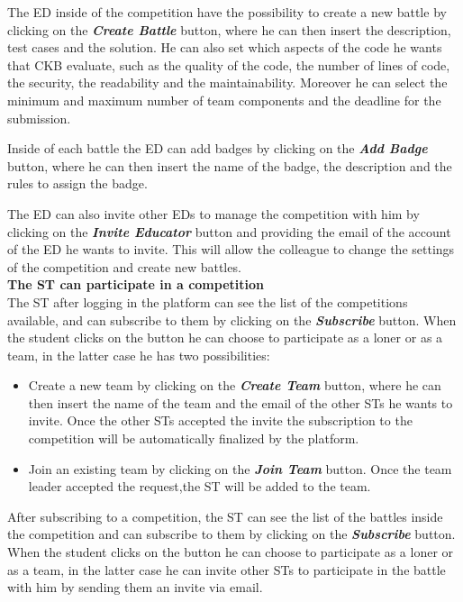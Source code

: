 The ED inside of the competition have the possibility to create a new battle by clicking on the \textbf{\textit{Create Battle}} button, where he can then insert the description, test cases and the solution. He can also set which aspects of the code he wants that CKB evaluate, such as the quality of the code, the number of lines of code, the security, the readability and the maintainability. Moreover he can select the minimum and maximum number of team components and the deadline for the submission.

Inside of each battle the ED can add badges by clicking on the \textbf{\textit{Add Badge}} button, where he can then insert the name of the badge, the description and the rules to assign the badge.

The ED can also invite other EDs to manage the competition with him by clicking on the \textbf{\textit{Invite Educator}} button and providing the email of the account of the ED he wants to invite. This will allow the colleague to change the settings of the competition and create new battles. \\

\textbf{The ST can participate in a competition} \\
The ST after logging in the platform can see the list of the competitions available, and can subscribe to them by clicking on the \textbf{\textit{Subscribe}} button. When the student clicks on the button he can choose to participate as a loner or as a team, in the latter case he has two possibilities: 
\begin{itemize}
  \item Create a new team by clicking on the \textbf{\textit{Create Team}} button, where he can then insert the name of the team and the email of the other STs he wants to invite. Once the other STs accepted the invite the subscription to the competition will be automatically finalized by the platform.
  \item Join an existing team by clicking on the \textbf{\textit{Join Team}} button. Once the team leader accepted the request,the ST will be added to the team.
\end{itemize}


After subscribing to a competition, the ST can see the list of the battles inside the competition and can subscribe to them by clicking on the \textbf{\textit{Subscribe}} button. When the student clicks on the button he can choose to participate as a loner or as a team, in the latter case he can invite other STs to participate in the battle with him by sending them an invite via email.

